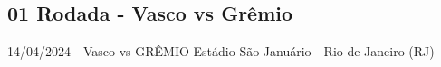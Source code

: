 \subsection{01 Rodada - Vasco vs Grêmio}

\begin{figure}[H]
    \centering
    
\end{figure}

14/04/2024 - Vasco vs GRÊMIO
Estádio São Januário - Rio de Janeiro (RJ)